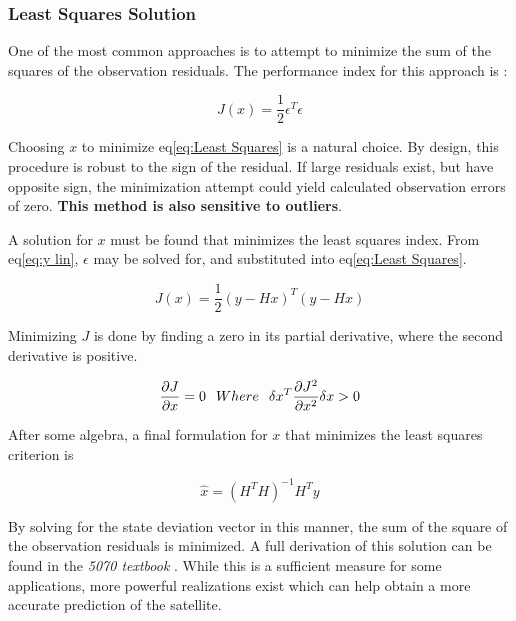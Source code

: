 \documentclass[12pt,a4paper,oneside]{article}
\numberwithin{equation}{section}   		%
\newcommand{\bad}[1]{\color{red}\textbf{#1}\color{black}}
\begin{document}
\subsubsection{Least Squares Solution}
\label{OD sub Least Squares}
One of the most common approaches is to attempt to minimize the sum of the squares of the observation residuals. The performance index for this approach is \cite{tapley2004statistical}: 

\begin{equation}
	J(x) = \frac{1}{2 }\epsilon^T \epsilon
	\label{eq:Least Squares}
\end{equation}

Choosing $x$ to minimize eq\eqref{eq:Least Squares} is a natural choice. By design, this procedure is robust to the sign of the residual. If large residuals exist, but have opposite sign, the minimization attempt could yield calculated observation errors of zero. \bad{This method is also sensitive to outliers}.

A solution for $x$ must be found that minimizes the least squares index. From eq\eqref{eq:y lin}, $\epsilon$ may be solved for, and substituted into eq\eqref{eq:Least Squares}. 

\begin{equation}
	J(x) = \frac{1}{2}(y-Hx)^T (y-Hx)
	\label{eq:Min Least Squares}
\end{equation}

Minimizing $J$ is done by finding a zero in its partial derivative, where the second derivative is positive. 

\begin{displaymath}
	\frac{\partial{J}}{\partial{x}} = 0 
	\hspace{0.25cm} Where \hspace{0.25cm}
	\delta{x}^T\frac{\partial{J}^2}{\partial{x}^2} \delta{x}> 0 
\end{displaymath}

After some algebra, a final formulation for $x$ that minimizes the least squares criterion is

\begin{equation}
	\hat{x} = (H^T H)^{-1} H^T y
	\label{eq:x Least Squares}
\end{equation}

By solving for the state deviation vector in this manner, the sum of the square of the observation residuals is minimized. A full derivation of this solution can be found in the \emph{5070 textbook} \cite{tapley2004statistical}. While this is a sufficient measure for some applications, more powerful realizations exist which can help obtain a more accurate prediction of the satellite. 
\end{document}
